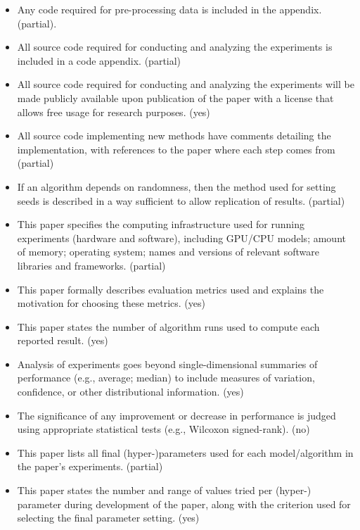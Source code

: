\begin{itemize}
\item Any code required for pre-processing data is included in the appendix. (partial).
\item All source code required for conducting and analyzing the experiments is included in a code appendix. (partial)
\item All source code required for conducting and analyzing the experiments will be made publicly available upon publication of the paper with a license that allows free usage for research purposes. (yes)
\item All source code implementing new methods have comments detailing the implementation, with references to the paper where each step comes from (partial)
\item If an algorithm depends on randomness, then the method used for setting seeds is described in a way sufficient to allow replication of results. (partial)
\item This paper specifies the computing infrastructure used for running experiments (hardware and software), including GPU/CPU models; amount of memory; operating system; names and versions of relevant software libraries and frameworks. (partial)
\item This paper formally describes evaluation metrics used and explains the motivation for choosing these metrics. (yes)
\item This paper states the number of algorithm runs used to compute each reported result. (yes)
\item Analysis of experiments goes beyond single-dimensional summaries of performance (e.g., average; median) to include measures of variation, confidence, or other distributional information. (yes)
\item The significance of any improvement or decrease in performance is judged using appropriate statistical tests (e.g., Wilcoxon signed-rank). (no)
\item This paper lists all final (hyper-)parameters used for each model/algorithm in the paper’s experiments. (partial)
\item This paper states the number and range of values tried per (hyper-) parameter during development of the paper, along with the criterion used for selecting the final parameter setting. (yes)
\end{itemize}
